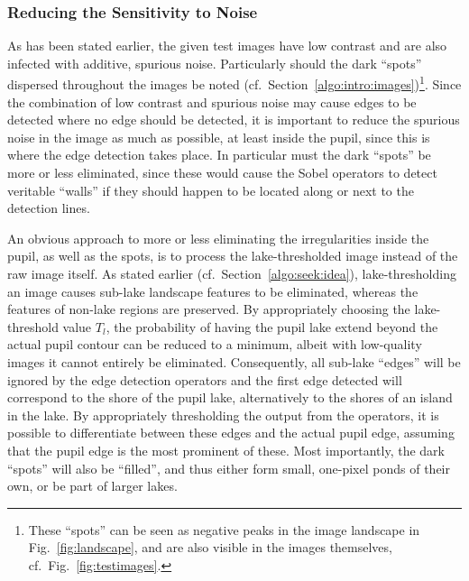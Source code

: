 \subsubsection{Reducing the Sensitivity to Noise}


As has been stated earlier, the given test images have low contrast
and are also infected with additive, spurious noise.  Particularly
should the dark ``spots'' dispersed throughout the images be noted
(cf.\ Section~\ref{algo:intro:images})\footnote{These ``spots'' can be
  seen as negative peaks in the image landscape in
  Fig.~\ref{fig:landscape}, and are also visible in the images
  themselves, cf.\ Fig.~\ref{fig:testimages}.}.  Since the combination
of low contrast and spurious noise may cause edges to be detected
where no edge should be detected, it is important to reduce the
spurious noise in the image as much as possible, at least inside the
pupil, since this is where the edge detection takes place.
In particular must the dark ``spots'' be more or less eliminated,
since these would cause the Sobel operators to detect veritable
``walls'' if they should happen to be located along or next to the
detection lines.

An obvious approach to more or less eliminating the irregularities
inside the pupil, as well as the spots, is to process the
lake-thresholded image instead of the raw image itself.  As stated
earlier (cf.\ Section~\ref{algo:seek:idea}), lake-thresholding an
image causes sub-lake landscape features to be eliminated, whereas the
features of non-lake regions are preserved.  By appropriately choosing
the lake-threshold value $T_{l}$, the probability of having the pupil
lake extend beyond the actual pupil contour can be reduced to a
minimum, albeit with low-quality images it cannot entirely be
eliminated.  Consequently, all sub-lake ``edges'' will be ignored by
the edge detection operators and the first edge detected will
correspond to the shore of the pupil lake, alternatively to the shores
of an island in the lake.  By appropriately thresholding the output
from the operators, it is possible to differentiate between these
edges and the actual pupil edge, assuming that the pupil edge is the
most prominent of these.  Most importantly, the dark ``spots'' will
also be ``filled'', and thus either form small, one-pixel ponds of
their own, or be part of larger lakes.


